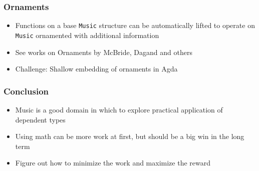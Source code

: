 \documentclass{beamer}
\begin{document}
\begin{frame}\frametitle{Ornaments}
\begin{itemize}
\item Functions on a base {\tt Music} structure can be automatically lifted to operate on {\tt Music} ornamented with additional information
\item See works on Ornaments by McBride, Dagand and others
\item Challenge: Shallow embedding of ornaments in Agda
\end{itemize}
\end{frame}

\begin{frame}\frametitle{Conclusion}
\begin{itemize}
\item Music is a good domain in which to explore  practical application of dependent types
\item Using math can be more work at first, but should be a big win in the long term
\item Figure out how to minimize the work and maximize the reward
\end{itemize}
\end{frame}
\end{document}
